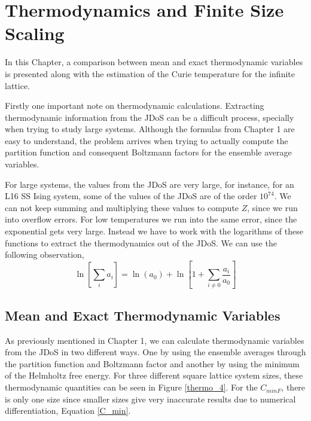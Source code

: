 \chapter{Thermodynamics and Finite Size Scaling}

	In this Chapter,  a comparison between mean and exact thermodynamic variables is presented along with the estimation of the Curie temperature for the infinite lattice.

	Firstly one important note on thermodynamic calculations. Extracting thermodynamic information from the JDoS can be a difficult process, specially when trying to study large systems. Although the formulas from Chapter 1 are easy to understand, the problem arrives when trying to actually compute the partition function and consequent Boltzmann factors for the ensemble average variables. 
	
	For large systems, the values from the JDoS are very large, for instance, for an L16 SS Ising system, some of the values of the JDoS are of the order $10^{74}$. We can not keep summing and multiplying these values to compute $Z$, since we run into overflow errors. For low temperatures we run into the same error, since the exponential gets very large. Instead we have to work with the logarithms of these functions to extract the thermodynamics out of the JDoS. We can use the following observation,
\begin{equation}
	\ln \left[  \sum_i a_i \right] = \ln(a_0) + \ln\left[ 1 + \sum_{i \neq 0} \frac{a_i}{a_0} \right]
\end{equation}

\section{Mean and Exact Thermodynamic Variables}

	As previously mentioned in Chapter 1, we can calculate thermodynamic variables from the JDoS in two different ways. One by using the ensemble averages through the partition function and Boltzmann factor and another by using the minimum of the Helmholtz free energy. For three different square lattice system sizes, these thermodynamic quantities can be seen in Figure \ref{thermo_4}. For the $C_{minF}$, there is only one size since smaller sizes give very inaccurate results due to numerical differentiation, Equation \ref{C_min}.
	
